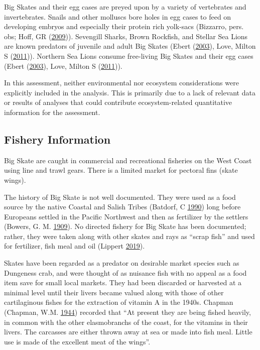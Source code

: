\documentclass[12pt,]{article}
\begin{document}
Big Skates and their egg cases are preyed upon by a variety of
vertebrates and invertebrates. Snails and other molluscs bore holes in
egg cases to feed on developing embryos and especially their protein
rich yolk-sacs (Bizzarro, pers. obs; Hoff, GR
(\protect\hyperlink{ref-Hoff2009}{2009})). Sevengill Sharks, Brown
Rockfish, and Stellar Sea Lions are known predators of juvenile and
adult Big Skates (Ebert (\protect\hyperlink{ref-Ebert2003}{2003}), Love,
Milton S (\protect\hyperlink{ref-Love2011}{2011})). Northern Sea Lions
consume free-living Big Skates and their egg cases (Ebert
(\protect\hyperlink{ref-Ebert2003}{2003}), Love, Milton S
(\protect\hyperlink{ref-Love2011}{2011})).

In this assessment, neither environmental nor ecosystem considerations
were explicitly included in the analysis. This is primarily due to a
lack of relevant data or results of analyses that could contribute
ecosystem-related quantitative information for the assessment.

\hypertarget{fishery-information}{%
\subsection{Fishery Information}\label{fishery-information}}

Big Skate are caught in commercial and recreational fisheries on the
West Coast using line and trawl gears. There is a limited market for
pectoral fins (skate wings).

The history of Big Skate is not well documented. They were used as a
food source by the native Coastal and Salish Tribes (Batdorf, C
\protect\hyperlink{ref-Batdorf1990}{1990}) long before Europeans settled
in the Pacific Northwest and then as fertilizer by the settlers (Bowers,
G. M. \protect\hyperlink{ref-Bowers1909}{1909}). No directed fishery for
Big Skate has been documented; rather, they were taken along with other
skates and rays as ``scrap fish'' and used for fertilizer, fish meal and
oil (Lippert \protect\hyperlink{ref-GregLippert}{2019}).

Skates have been regarded as a predator on desirable market species such
as Dungeness crab, and were thought of as nuisance fish with no appeal
as a food item save for small local markets. They had been discarded or
harvested at a minimal level until their livers became valued along with
those of other cartilaginous fishes for the extraction of vitamin A in
the 1940s. Chapman (Chapman, W.M.
\protect\hyperlink{ref-Chapman1944}{1944}) recorded that ``At present
they are being fished heavily, in common with the other elasmobranchs of
the coast, for the vitamins in their livers. The carcasses are either
thrown away at sea or made into fish meal. Little use is made of the
excellent meat of the wings''.
\end{document}
